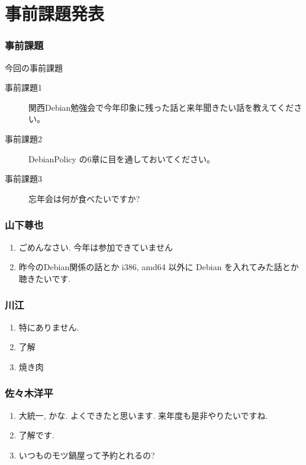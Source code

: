 \documentclass[cjk,dvipdfmx,10pt,compress,%
hyperref={bookmarks=true,bookmarksnumbered=true,bookmarksopen=false,%
colorlinks=false,%
pdftitle={第 67 回 関西 Debian 勉強会},%
pdfauthor={倉敷・のがた・佐々木・かわだ},%
pdfsubject={資料},%
}]{beamer}
\begin{document}

\section{事前課題発表}


\begin{frame}[fragile]
  \frametitle{事前課題}
  \begin{block}{今回の事前課題}
    \begin{description}
    \item[事前課題1] 関西Debian勉強会で今年印象に残った話と来年聞きたい話を教えてください。
    \item[事前課題2] DebianPolicy の6章に目を通しておいてください。
    \item[事前課題3] 忘年会は何が食べたいですか?
    \end{description}
  \end{block}
\end{frame}


\begin{frame}
  \frametitle{山下尊也}
  \begin{enumerate}
  \item ごめんなさい. 今年は参加できていません
  \item 昨今のDebian関係の話とか i386, amd64 以外に Debian を入れてみた話とか聴きたいです.
  \end{enumerate}
\end{frame}

\begin{frame}
  \frametitle{川江}
  \begin{enumerate}
  \item 特にありません.
  \item 了解
  \item 焼き肉
  \end{enumerate}
\end{frame}

\begin{frame}
  \frametitle{ 佐々木洋平 }
  \begin{enumerate}
  \item 大統一, かな. よくできたと思います. 来年度も是非やりたいですね.
  \item 了解です.
  \item いつものモツ鍋屋って予約とれるの?
  \end{enumerate}
\end{frame}
\end{document}
